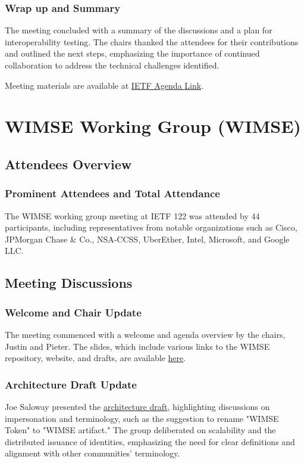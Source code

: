 \documentclass{article}
\begin{document}
\subsubsection{Wrap up and Summary}
The meeting concluded with a summary of the discussions and a plan for interoperability testing. The chairs thanked the attendees for their contributions and outlined the next steps, emphasizing the importance of continued collaboration to address the technical challenges identified.

Meeting materials are available at \href{https://datatracker.ietf.org/meeting/122/agenda/?show=webtrans}{IETF Agenda Link}.




\newpage

\section{WIMSE Working Group (WIMSE)}

\subsection{Attendees Overview}
\subsubsection{Prominent Attendees and Total Attendance}
The WIMSE working group meeting at IETF 122 was attended by 44 participants, including representatives from notable organizations such as Cisco, JPMorgan Chase \& Co., NSA-CCSS, UberEther, Intel, Microsoft, and Google LLC. 

\subsection{Meeting Discussions}

\subsubsection{Welcome and Chair Update}
The meeting commenced with a welcome and agenda overview by the chairs, Justin and Pieter. The slides, which include various links to the WIMSE repository, website, and drafts, are available \href{https://datatracker.ietf.org/meeting/122/materials/slides-122-wimse-workload-to-workload-protocol-00}{here}.

\subsubsection{Architecture Draft Update}
Joe Saloway presented the \href{https://datatracker.ietf.org/doc/draft-ietf-wimse-arch/}{architecture draft}, highlighting discussions on impersonation and terminology, such as the suggestion to rename "WIMSE Token" to "WIMSE artifact." The group deliberated on scalability and the distributed issuance of identities, emphasizing the need for clear definitions and alignment with other communities' terminology.
\end{document}
